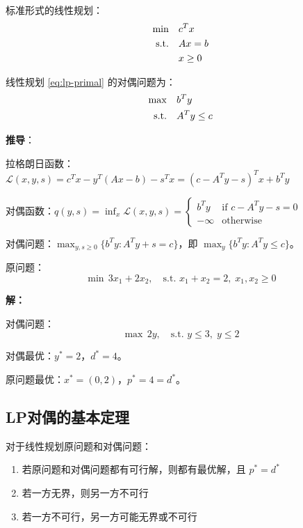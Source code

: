 标准形式的线性规划：
\begin{align}
\min \quad & c^T x \label{eq:lp-primal} \\
\text{s.t.} \quad & Ax = b \notag \\
& x \geq 0 \notag
\end{align}

\begin{theorem}[LP对偶]
线性规划 \eqref{eq:lp-primal} 的对偶问题为：
\begin{align}
\max \quad & b^T y \label{eq:lp-dual} \\
\text{s.t.} \quad & A^T y \leq c \notag
\end{align}
\end{theorem}

\textbf{推导}：

拉格朗日函数：$\mathcal{L}(x, y, s) = c^T x - y^T(Ax - b) - s^T x = (c - A^T y - s)^T x + b^T y$

对偶函数：$q(y, s) = \inf_{x} \mathcal{L}(x, y, s) = \begin{cases} b^T y & \text{if } c - A^T y - s = 0 \\ -\infty & \text{otherwise} \end{cases}$

对偶问题：$\max_{y, s \geq 0} \{b^T y : A^T y + s = c\}$，即 $\max_y \{b^T y : A^T y \leq c\}$。

\begin{example}[LP对偶]
原问题：
\[
\min \, 3x_1 + 2x_2, \quad \text{s.t. } x_1 + x_2 = 2, \; x_1, x_2 \geq 0
\]

\textbf{解：}

对偶问题：
\[
\max \, 2y, \quad \text{s.t. } y \leq 3, \; y \leq 2
\]

对偶最优：$y^* = 2$，$d^* = 4$。

原问题最优：$x^* = (0, 2)$，$p^* = 4 = d^*$。
\end{example}

\subsection{LP对偶的基本定理}

\begin{theorem}[LP对偶定理]
对于线性规划原问题和对偶问题：
\begin{enumerate}
    \item 若原问题和对偶问题都有可行解，则都有最优解，且 $p^* = d^*$
    \item 若一方无界，则另一方不可行
    \item 若一方不可行，另一方可能无界或不可行
\end{enumerate}
\end{theorem}


